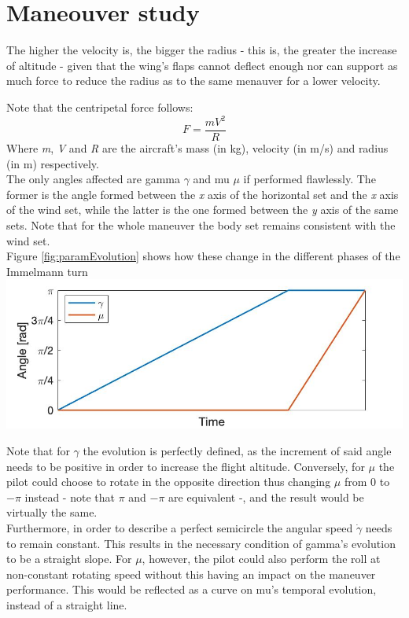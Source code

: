 \section*{Maneouver study}
The higher the velocity is, the bigger the radius - this is, the greater the increase of altitude - given that the wing's flaps cannot deflect enough nor can support as much force to reduce the radius as to the same menauver for a lower velocity.

Note that the centripetal force follows:
\[
F=\frac{mV^2}{R}
\]
Where \textit{m}, \textit{V} and \textit{R} are the aircraft's mass (in kg), velocity (in m/s) and radius (in m) respectively. \\

The only angles affected are gamma $\gamma$ and mu $\mu$ if performed flawlessly. The former is the angle formed between the \textit{x} axis of the horizontal set and the \textit{x} axis of the wind set, while the latter is the one formed between the \textit{y} axis of the same sets. Note that for the whole maneuver the body set remains consistent with the wind set.\\
Figure \ref{fig:paramEvolution} shows how these change in the different phases of the Immelmann turn\\

\includegraphics[width=\linewidth]{../matlab/paramEvolution.jpg}
\label{fig:paramEvolution}
\vspace{0.5cm}

Note that for $\gamma$ the evolution is perfectly defined, as the increment of said angle needs to be positive in order to increase the flight altitude. Conversely, for $\mu$ the pilot could choose to rotate in the opposite direction thus changing $\mu$ from 0 to $-\pi$ instead - note that $\pi$ and $-\pi$ are equivalent -, and the result would be virtually the same.\\
Furthermore, in order to describe a perfect semicircle the angular speed $\dot{\gamma}$ needs to remain constant. This results in the necessary condition of gamma's evolution to be a straight slope. For $\mu$, however, the pilot could also perform the roll at non-constant rotating speed without this having an impact on the maneuver performance. This would be reflected as a curve on mu's temporal evolution, instead of a straight line.

